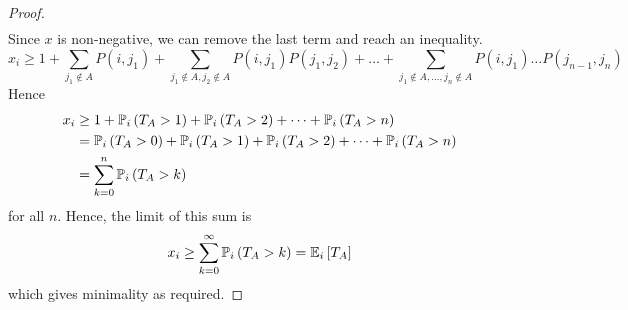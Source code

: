 \begin{proof}
\begin{align*}
	\end{align*}
	Since \( x \) is non-negative, we can remove the last term and reach an inequality.
	\[
		x_i \geq 1 + \sum_{j_1 \not\in A} P(i,j_1) + \sum_{j_1 \not\in A, j_2 \not\in A} P(i,j_1)P(j_1,j_2) + \dots + \sum_{j_1 \not\in A, \dots, j_n \not\in A} P(i,j_1) \dots P(j_{n-1}, j_n)
	\]
	Hence
	\begin{align*}
		x_i & \geq 1 + \mathbb{P}_{i}\left({T_A > 1}\right) + \mathbb{P}_{i}\left({T_A > 2}\right) + \dots + \mathbb{P}_{i}\left({T_A > n}\right)              \\
		    & = \mathbb{P}_{i}\left({T_A > 0}\right) + \mathbb{P}_{i}\left({T_A > 1}\right) + \mathbb{P}_{i}\left({T_A > 2}\right) + \dots + \mathbb{P}_{i}\left({T_A > n}\right) \\
		    & = \sum_{k = 0}^n \mathbb{P}_{i}\left({T_A > k}\right)
	\end{align*}
	for all \( n \).
	Hence, the limit of this sum is
	\[
		x_i \geq \sum_{k=0}^\infty \mathbb{P}_{i}\left({T_A > k}\right) = \mathbb{E}_{i}\left[{T_A}\right]
	\]
	which gives minimality as required.
\end{proof}
